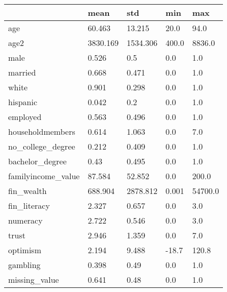 \begin{tabular}{lllll}
\hline
 & mean & std & min & max \\
\hline
age & 60.463 & 13.215 & 20.0 & 94.0 \\
age2 & 3830.169 & 1534.306 & 400.0 & 8836.0 \\
male & 0.526 & 0.5 & 0.0 & 1.0 \\
married & 0.668 & 0.471 & 0.0 & 1.0 \\
white & 0.901 & 0.298 & 0.0 & 1.0 \\
hispanic & 0.042 & 0.2 & 0.0 & 1.0 \\
employed & 0.563 & 0.496 & 0.0 & 1.0 \\
householdmembers & 0.614 & 1.063 & 0.0 & 7.0 \\
no_college_degree & 0.212 & 0.409 & 0.0 & 1.0 \\
bachelor_degree & 0.43 & 0.495 & 0.0 & 1.0 \\
familyincome_value & 87.584 & 52.852 & 0.0 & 200.0 \\
fin_wealth & 688.904 & 2878.812 & 0.001 & 54700.0 \\
fin_literacy & 2.327 & 0.657 & 0.0 & 3.0 \\
numeracy & 2.722 & 0.546 & 0.0 & 3.0 \\
trust & 2.946 & 1.359 & 0.0 & 7.0 \\
optimism & 2.194 & 9.488 & -18.7 & 120.8 \\
gambling & 0.398 & 0.49 & 0.0 & 1.0 \\
missing_value & 0.641 & 0.48 & 0.0 & 1.0 \\
\hline
\end{tabular}
